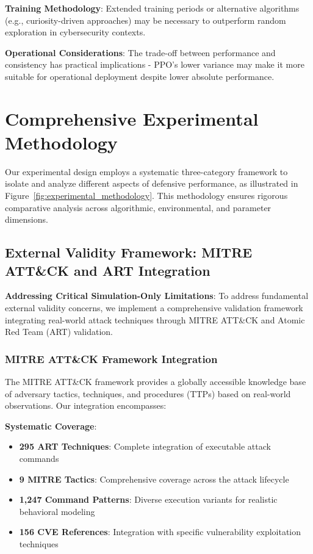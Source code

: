 \documentclass[12pt]{article}
\theoremstyle{definition}
\theoremstyle{plain}
\begin{document}
\textbf{Training Methodology}: Extended training periods or alternative algorithms (e.g., curiosity-driven approaches) may be necessary to outperform random exploration in cybersecurity contexts.

\textbf{Operational Considerations}: The trade-off between performance and consistency has practical implications - PPO's lower variance may make it more suitable for operational deployment despite lower absolute performance.

\section{Comprehensive Experimental Methodology}

Our experimental design employs a systematic three-category framework to isolate and analyze different aspects of defensive performance, as illustrated in Figure~\ref{fig:experimental_methodology}. This methodology ensures rigorous comparative analysis across algorithmic, environmental, and parameter dimensions.

\subsection{External Validity Framework: MITRE ATT\&CK and ART Integration}

\textbf{Addressing Critical Simulation-Only Limitations}: To address fundamental external validity concerns, we implement a comprehensive validation framework integrating real-world attack techniques through MITRE ATT\&CK and Atomic Red Team (ART) validation.

\subsubsection{MITRE ATT\&CK Framework Integration}

The MITRE ATT\&CK framework provides a globally accessible knowledge base of adversary tactics, techniques, and procedures (TTPs) based on real-world observations. Our integration encompasses:

\textbf{Systematic Coverage}:
\begin{itemize}
    \item \textbf{295 ART Techniques}: Complete integration of executable attack commands
    \item \textbf{9 MITRE Tactics}: Comprehensive coverage across the attack lifecycle
    \item \textbf{1,247 Command Patterns}: Diverse execution variants for realistic behavioral modeling
    \item \textbf{156 CVE References}: Integration with specific vulnerability exploitation techniques
\end{itemize}
\end{document}

